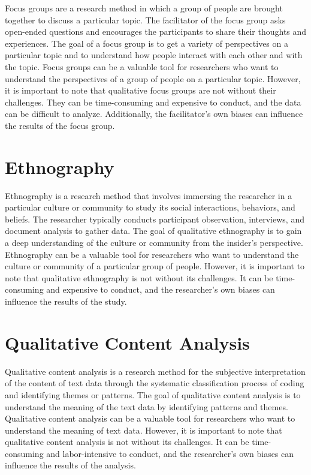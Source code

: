 \documentclass[
  b5paper]{book}
\begin{document}
Focus groups are a research method in which a group of people are brought together to discuss a particular topic. The facilitator of the focus group asks open-ended questions and encourages the participants to share their thoughts and experiences. The goal of a focus group is to get a variety of perspectives on a particular topic and to understand how people interact with each other and with the topic. Focus groups can be a valuable tool for researchers who want to understand the perspectives of a group of people on a particular topic. However, it is important to note that qualitative focus groups are not without their challenges. They can be time-consuming and expensive to conduct, and the data can be difficult to analyze. Additionally, the facilitator's own biases can influence the results of the focus group.

\hypertarget{ethnography}{%
\section*{Ethnography}\label{ethnography}}

Ethnography is a research method that involves immersing the researcher in a particular culture or community to study its social interactions, behaviors, and beliefs. The researcher typically conducts participant observation, interviews, and document analysis to gather data. The goal of qualitative ethnography is to gain a deep understanding of the culture or community from the insider's perspective. Ethnography can be a valuable tool for researchers who want to understand the culture or community of a particular group of people. However, it is important to note that qualitative ethnography is not without its challenges. It can be time-consuming and expensive to conduct, and the researcher's own biases can influence the results of the study.

\hypertarget{qualitative-content-analysis}{%
\section*{Qualitative Content Analysis}\label{qualitative-content-analysis}}

Qualitative content analysis is a research method for the subjective interpretation of the content of text data through the systematic classification process of coding and identifying themes or patterns. The goal of qualitative content analysis is to understand the meaning of the text data by identifying patterns and themes. Qualitative content analysis can be a valuable tool for researchers who want to understand the meaning of text data. However, it is important to note that qualitative content analysis is not without its challenges. It can be time-consuming and labor-intensive to conduct, and the researcher's own biases can influence the results of the analysis.
\end{document}
